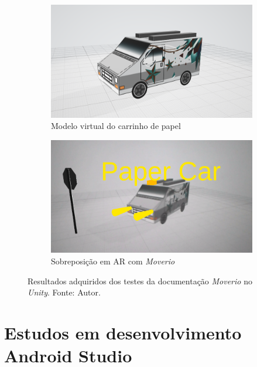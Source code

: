\begin{figure}[ht]
    \centering
        \begin{subfigure}{.45\textwidth}
            \centering
            \includegraphics[width=.95\textwidth]{figuras/PaperCar.png}
            \caption{Modelo virtual do carrinho de papel}
            \label{fig:papercar-stl}
        \end{subfigure}
        \begin{subfigure}{.45\textwidth}
            \centering
            \includegraphics[width=.95\textwidth]{figuras/PaperCarAR.png}
            \caption{Sobreposição em AR com \textit{Moverio}}
            \label{fig:papercar-ar}
        \end{subfigure}
        \caption{Resultados adquiridos dos testes da documentação \textit{Moverio} no \textit{Unity}. Fonte: Autor.}
        \label{fig:papercar-tests}
\end{figure}

\section{Estudos em desenvolvimento Android Studio}

